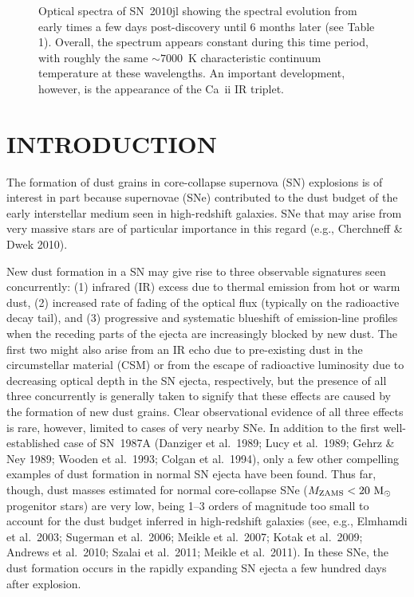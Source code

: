 \documentclass{emulateapj}
\begin{document}


\begin{figure*}
\caption{Optical spectra of SN~2010jl showing the spectral evolution
  from early times a few days post-discovery until 6 months later (see
  Table 1).  Overall, the spectrum appears constant during this time
  period, with roughly the same $\sim 7000$~K characteristic continuum
  temperature at these wavelengths.  An important development, however,
  is the appearance of the Ca~{\sc ii} IR triplet.}
\label{fig:spec}
\end{figure*}

\section{INTRODUCTION}

The formation of dust grains in core-collapse supernova (SN)
explosions is of interest in part because supernovae (SNe)
contributed to the dust budget of the early interstellar medium seen
in high-redshift galaxies.  SNe that may arise from very massive stars
are of particular importance in this regard (e.g., Cherchneff \& Dwek
2010).

New dust formation in a SN may give rise to three observable
signatures seen concurrently: (1) infrared (IR) excess due to thermal
emission from hot or warm dust, (2) increased rate of fading of the
optical flux (typically on the radioactive decay tail), and (3)
progressive and systematic blueshift of emission-line profiles when
the receding parts of the ejecta are increasingly blocked by new dust.
The first two might also arise from an IR echo due to pre-existing
dust in the circumstellar material (CSM) or from the escape of
radioactive luminosity due to decreasing optical depth in the SN
ejecta, respectively, but the presence of all three concurrently is
generally taken to signify that these effects are caused by the
formation of new dust grains.  Clear observational evidence of all
three effects is rare, however, limited to cases of very nearby SNe.
In addition to the first well-established case of SN~1987A (Danziger
et al.\ 1989; Lucy et al.\ 1989; Gehrz \& Ney 1989; Wooden et al.\
1993; Colgan et al.\ 1994), only a few other compelling examples of
dust formation in normal SN ejecta have been found.  Thus far, though,
dust masses estimated for normal core-collapse SNe ($M_{\rm ZAMS} <
20~ {\rm M}_{\odot}$ progenitor stars) are very low, being 1--3 orders
of magnitude too small to account for the dust budget inferred in
high-redshift galaxies (see, e.g., Elmhamdi et al.\ 2003; Sugerman et
al.\ 2006; Meikle et al.\ 2007; Kotak et al.\ 2009; Andrews et al.\
2010; Szalai et al.\ 2011; Meikle et al.\ 2011).  In these SNe, the
dust formation occurs in the rapidly expanding SN ejecta a few hundred
days after explosion.
\end{document}
